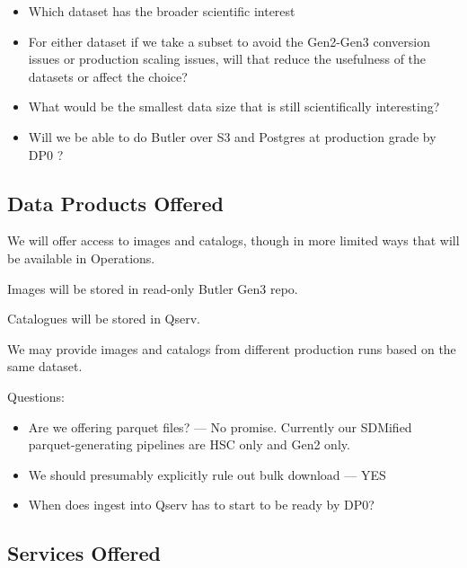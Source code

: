 \begin{itemize}

\item Which dataset has the broader scientific interest

\item For either dataset if we take a subset to avoid the Gen2-Gen3 conversion issues or production scaling issues, will that reduce the usefulness of the datasets or affect the choice?

\item What would be the smallest data size that is still scientifically interesting?

\item Will we be able to do Butler over S3 and Postgres at production grade by DP0 ?

\end{itemize}

\subsection{Data Products Offered}

We will offer access to images and catalogs, though in more limited ways that will be available in Operations.

Images will be stored in read-only Butler Gen3 repo.

Catalogues will be stored in Qserv.

We may provide images and catalogs from different production runs based on the same dataset.

Questions:

\begin{itemize}

\item Are we offering parquet files? --- No promise. Currently our SDMified parquet-generating pipelines are HSC only and Gen2 only.

\item We should presumably explicitly rule out bulk download  --- YES

\item When does ingest into Qserv has to start to be ready by DP0?

\end{itemize}

\subsection{Services Offered}

